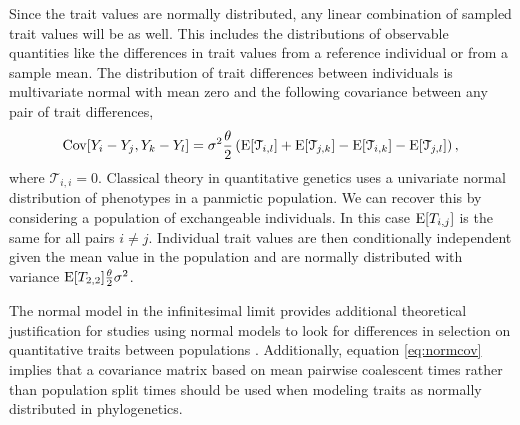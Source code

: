 Since the trait values are normally distributed, any linear combination of
sampled trait values will be as well. This includes the distributions of
observable quantities like the differences in trait values from a reference
individual or from a sample mean. The distribution of trait differences between
individuals is multivariate normal with mean zero and the following covariance
between any pair of trait differences,
\begin{equation}
  \label{eq:normcov}
\mathrm{Cov}[Y_i-Y_j,Y_k-Y_l] = \sigma^2\frac{\theta}{2}\left( \mathrm{E}[\mathcal{T}_{i,l}] + \mathrm{E}[\mathcal{T}_{j,k}] -
\mathrm{E}[\mathcal{T}_{i,k}] - \mathrm{E}[\mathcal{T}_{j,l}] \right),
\end{equation}
where $\mathcal{T}_{i,i} = 0$. Classical theory in quantitative genetics uses a
univariate normal distribution of phenotypes in a panmictic population. We can
recover this by considering a population of exchangeable individuals. In this
case $\mathrm{E}[T_{i,j}]$ is the same for all pairs $i \neq j$. Individual trait values
are then conditionally independent given the mean value in the population and
are normally distributed with variance $\mathrm{E}[T_{2,2}]\frac{\theta}{2}\sigma^2$.

The normal model in the infinitesimal limit provides additional theoretical
justification for studies using normal models to look for differences in
selection on quantitative traits between populations
\citep{Ovaskainen2011,Praebel2013,Robinson2015}. Additionally, equation
\eqref{eq:normcov} implies that a covariance matrix based on mean pairwise
coalescent times rather than population split times should be used when modeling
traits as normally distributed in phylogenetics.

 

